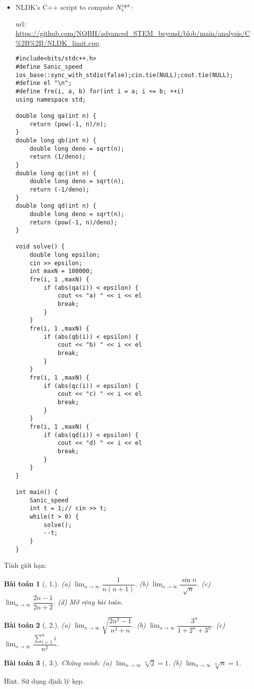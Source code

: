 \documentclass[oneside]{book}
\newtheorem{baitoan}{Bài toán}
\begin{document}
\begin{itemize}
	\item NLDK's C++ script to compute $N_\varepsilon^{\rm opt}$:
	
	{\sc url}: \url{https://github.com/NQBH/advanced_STEM_beyond/blob/main/analysis/C%2B%2B/NLDK_limit.cpp}.
	\begin{verbatim}
#include<bits/stdc++.h>
#define Sanic_speed ios_base::sync_with_stdio(false);cin.tie(NULL);cout.tie(NULL);
#define el "\n";
#define fre(i, a, b) for(int i = a; i <= b; ++i)
using namespace std;

double long qa(int n) {
    return (pow(-1, n)/n);
}
double long qb(int n) {
    double long deno = sqrt(n);
    return (1/deno);
}
double long qc(int n) {
    double long deno = sqrt(n);
    return (-1/deno);
}
double long qd(int n) {
    double long deno = sqrt(n);
    return (pow(-1, n)/deno);
}

void solve() {
    double long epsilon;
    cin >> epsilon;
    int maxN = 100000;
    fre(i, 1 ,maxN) {
        if (abs(qa(i)) < epsilon) {
            cout << "a) " << i << el
            break;
        }
    }
    fre(i, 1 ,maxN) {
        if (abs(qb(i)) < epsilon) {
            cout << "b) " << i << el
            break;
        }
    }
    fre(i, 1 ,maxN) {
        if (abs(qc(i)) < epsilon) {
            cout << "c) " << i << el
            break;
        }
    }
    fre(i, 1 ,maxN) {
        if (abs(qd(i)) < epsilon) {
            cout << "d) " << i << el
            break;
        }
    }
}

int main() {
    Sanic_speed
    int t = 1;// cin >> t;
    while(t > 0) {
    	solve();
    	--t;
   	}
}
	\end{verbatim}
\end{itemize}
Tính giới hạn:

\begin{baitoan}[\cite{TLCT_dai_so_giai_tich_11}, 1.]
	(a) $\lim_{n\to\infty} \dfrac{1}{n(n + 1)}$. (b) $\lim_{n\to\infty} \dfrac{\sin n}{\sqrt{n}}$. (c) $\lim_{n\to\infty} \dfrac{2n - 1}{2n + 2}$. (d) Mở rộng bài toán.
\end{baitoan}

\begin{baitoan}[\cite{TLCT_dai_so_giai_tich_11}, 2.]
	(a) $\lim_{n\to\infty} \sqrt{\dfrac{2n^2 - 1}{n^2 + n}}$. (b) $\lim_{n\to\infty} \dfrac{3^n}{1 + 2^n + 3^n}$. (c) $\lim_{n\to\infty} \dfrac{\sum_{i=1}^n i}{n^2}$.
\end{baitoan}

\begin{baitoan}[\cite{TLCT_dai_so_giai_tich_11}, 3.]
	Chứng minh: (a) $\lim_{n\to\infty} \sqrt[n]{2} = 1$. (b) $\lim_{n\to\infty} \sqrt[n]{n} = 1$. 
\end{baitoan}
{\sf Hint.} Sử dụng định lý kẹp.
\end{document}
